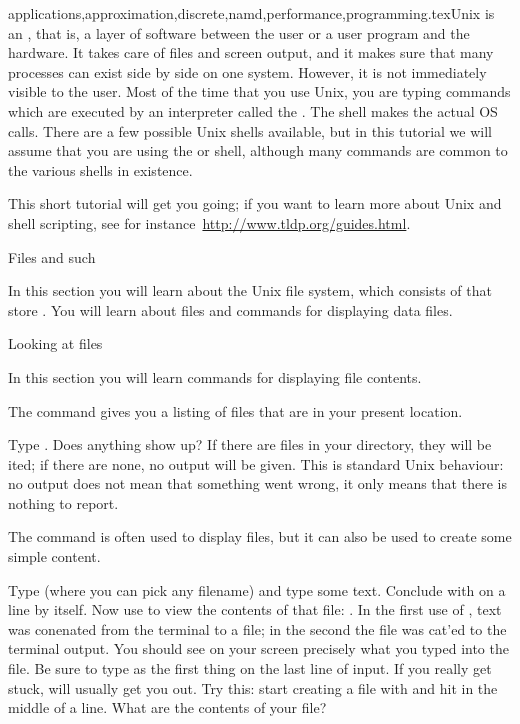 {applications,approximation,discrete,namd,performance,programming}.texUnix is an , that is, a layer of software
between the user or a user program and the hardware. It takes care of
files and screen output, and it makes sure that many processes can exist
side by side on one system. However, it is not immediately visible to
the user.
%
Most of the time that you use Unix, you are typing commands which are
executed by an interpreter called the . The shell
makes the actual \ac{OS} calls. There are a few possible Unix shells
available, but in this tutorial we will assume that you are using the
 or  shell, although many commands are
common to the various shells in existence.

This short tutorial will get you going; 
if you want to learn more about Unix and shell scripting,
see for instance~\url{http://www.tldp.org/guides.html}.

 {Files and such}

\begin{purpose}
In this section you will learn about the Unix file system, which
consists of  that store . You
will learn about  files and commands for
displaying data files.
\end{purpose}

 {Looking at files}

\begin{purpose}
In this section you will learn commands for displaying file contents.
\end{purpose}

The  command gives you a listing of files that are in your
present location. 

\practical
{Type . Does anything show up?}
{If there are files in your directory, they will be ited; if
  there are none, no output will be given. This is standard Unix
  behaviour: no output does not mean that something went wrong, it
  only means that there is nothing to report.}{}

The  command is often used to display files, but it can also be
used to create some simple content. 

\practical
{Type  (where you can pick any
  filename) and type some text. Conclude with  on a line by itself.
Now use  to view the contents of that file: .}
{In the first use of , text was conenated from the
  terminal to a file; in the second the file was cat'ed to the
  terminal output. You should see on your screen precisely what you
  typed into the file.}
{Be sure to type  as the first thing on the last line of input. If you
  really get stuck,  will usually get you out. Try this:
  start creating a file with  and hit  in
  the middle of a line. What are the contents of your file?}

